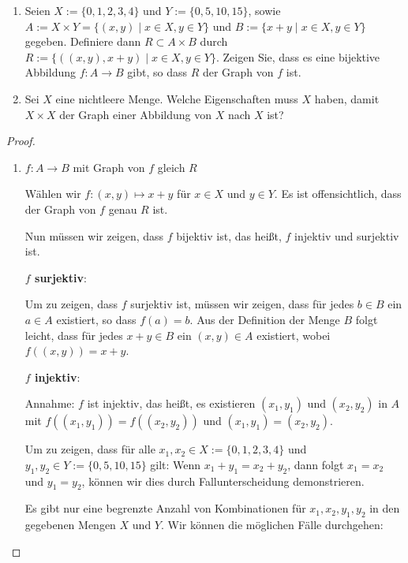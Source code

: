 \documentclass{../problemset}
\begin{document}
\pagebreak

\begin{problem}[Graphen]
$ $
\begin{enumerate}
	\item Seien $X := \{0, 1, 2, 3, 4\}$ und $Y := \{0, 5, 10, 15\}$, sowie $A := X \times Y = \{(x, y) \mid x \in X, y \in Y\}$ und $B := \{x + y \mid x \in X, y \in Y\}$ gegeben. Definiere dann $R \subset A \times B$ durch $R := \{((x, y), x + y) \mid x \in X, y \in Y\}$.
	      Zeigen Sie, dass es eine bijektive Abbildung $f : A \to B$ gibt, so dass $R$ der Graph von $f$ ist.

	\item Sei $X$ eine nichtleere Menge. Welche Eigenschaften muss $X$ haben, damit $X \times X$ der Graph einer Abbildung von $X$ nach $X$ ist?

\end{enumerate}

\begin{proof} $ $
	\begin{enumerate}
		\item $f: A \rightarrow B$ mit Graph von $f$ gleich $R$

		      Wählen wir \(f: (x, y) \mapsto x + y\) für \(x \in X\) und \(y \in Y\).
		      Es ist offensichtlich, dass der Graph von \(f\) genau \(R\) ist.

		      Nun müssen wir zeigen, dass \(f\) bijektiv ist, das heißt, \(f\) injektiv und surjektiv ist.

		      \textbf{\(f\) surjektiv}:

		      Um zu zeigen, dass \(f\) surjektiv ist, müssen wir zeigen, dass für jedes \(b \in B\) ein \(a \in A\) existiert, so dass \(f(a) = b\).
		      Aus der Definition der Menge \(B\) folgt leicht, dass für jedes \(x + y \in B\) ein \((x, y) \in A\) existiert, wobei \(f((x, y)) = x + y\).

		      \textbf{\(f\) injektiv}:

		      Annahme: \(f\) ist injektiv, das heißt, es existieren \((x_1, y_1)\) und \((x_2, y_2)\) in \(A\) mit \(f((x_1, y_1)) = f((x_2, y_2))\) und \((x_1, y_1) = (x_2, y_2)\).

		      Um zu zeigen, dass für alle \(x_1, x_2 \in X := \{0, 1, 2, 3, 4\}\) und \(y_1, y_2 \in Y := \{0, 5, 10, 15\}\) gilt: Wenn \(x_1 + y_1 = x_2 + y_2\), dann folgt \(x_1 = x_2\) und \(y_1 = y_2\), können wir dies durch Fallunterscheidung demonstrieren.

		      Es gibt nur eine begrenzte Anzahl von Kombinationen für \(x_1, x_2, y_1, y_2\) in den gegebenen Mengen \(X\) und \(Y\). Wir können die möglichen Fälle durchgehen:


\end{enumerate}
\end{proof}
\end{problem}
\end{document}
